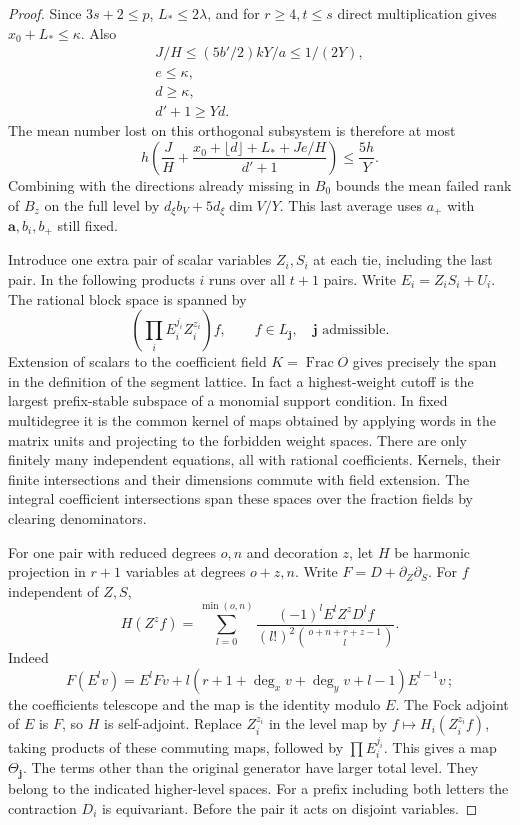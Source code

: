 \begin{proof}
Since \(3s+2\le p\), \(L_*\le2\lambda\), and for \(r\ge4,t\le s\)
direct multiplication gives \(x_0+L_*\le\kappa\).
Also \[
 \begin{gathered}
 J/H\le(5b'/2)kY/a\le1/(2Y), \\ e\le\kappa, \\ d\ge\kappa, \\ d'+1\ge Yd.
\end{gathered}
\]
The mean number lost on this orthogonal subsystem is therefore
at most
\[
 h\left(\frac{J}{H}+
   \frac{x_0+\lfloor d\rfloor+L_*+Je/H}{d'+1}\right)
 \le \frac{5h}{Y}.
\]
Combining with the directions already missing in \(B_0\)
bounds the mean failed rank of \(B_z\) on the full level by
\(d_\xi b_V+5d_\xi\dim V/Y\). This last average uses \(a_+\)
with \(\mathbf a,b_i,b_+\) still fixed.

Introduce one extra pair of scalar variables \(Z_i,S_i\) at each
tie, including the last pair. In the following products \(i\)
runs over all \(t+1\) pairs. Write \(E_i=Z_iS_i+U_i\).
The rational block space is spanned by
\[
 \left(\prod_i E_i^{j_i}Z_i^{z_i}\right) f,\qquad
               f\in L_{\mathbf j},\quad \mathbf j\text{ admissible}.
\]
Extension of scalars to the coefficient field \(K=\operatorname{Frac}O\)
gives precisely the span in the definition of the segment lattice.
In fact a highest-weight cutoff is the largest prefix-stable
subspace of a monomial support condition. In fixed multidegree it is
the common kernel of maps obtained by applying words in the matrix
units and projecting to the forbidden weight spaces. There are only
finitely many independent equations, all with rational coefficients.
Kernels, their finite intersections and their dimensions commute
with field extension. The integral coefficient intersections span
these spaces over the fraction fields by clearing denominators.

For one pair with reduced degrees \(o,n\) and decoration \(z\),
let \(H\) be harmonic projection in \(r+1\) variables at degrees
\(o+z,n\). Write \(F=D+\partial_Z\partial_S\).
For \(f\) independent of \(Z,S\),
\[
 H(Z^z f)=\sum_{l=0}^{\min(o,n)}
  \frac{(-1)^l E^l Z^z D^l f}{(l!)^2\binom{o+n+r+z-1}{l}}.
\]
Indeed \[
 F(E^l v)=E^lFv+l(r+1+\deg_x v+\deg_y v+l-1) E^{l-1}v\,;
\] the coefficients telescope and the map is the
identity modulo \(E\). The Fock adjoint of \(E\) is \(F\), so
\(H\) is self-adjoint. Replace \(Z_i^{z_i}\) in the level map
by \(f\mapsto H_i(Z_i^{z_i} f)\), taking products of these
commuting maps, followed by \(\prod E_i^{j_i}\).
This gives a map \(\Theta_{\mathbf j}\). The terms other than the
original generator have larger total level. They belong to the
indicated higher-level spaces. For a prefix including both letters
the contraction \(D_i\) is equivariant. Before the pair it acts on disjoint variables.


\end{proof}
